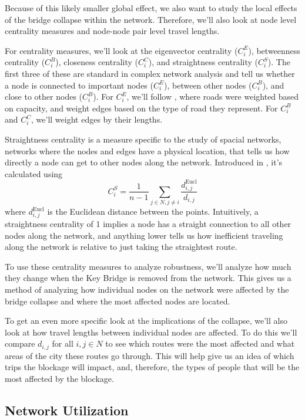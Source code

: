 \documentclass[11pt]{article}
\numberwithin{equation}{section} %
\numberwithin{figure}{section} %
\numberwithin{table}{section} %
\theoremstyle{definition}
\begin{document}
Because of this likely smaller global effect, we also want to study the local effects of the bridge collapse within the network. Therefore, we'll also look at node level centrality measures and node-node pair level travel lengths.

For centrality measures, we'll look at the eigenvector centrality ($C^E_i$), betweenness centrality ($C^B_i$), closeness centrality ($C^C_i$), and straightness centrality ($C^S_i$). The first three of these are standard in complex network analysis and tell us whether a node is connected to important nodes ($C^E_i$), between other nodes ($C^B_i$), and close to other nodes ($C^B_i$). For $C_i^E$, we'll follow \cite{Ando20}, where roads were weighted based on capacity, and weight edges based on the type of road they represent. For $C^B_i$ and $C^C_i$, we'll weight edges by their lengths.

Straightness centrality is a measure specific to the study of spacial networks, networks where the nodes and edges have a physical location, that tells us how directly a node can get to other nodes along the network. Introduced in \cite{Porta06}, it's calculated using 
\[
  C_i^S = \frac{1}{n-1} \sum_{j \in N, j \neq i} \frac{d_{i, j}^\text{Eucl}}{d_{i, j}}
\]
where $d_{i, j}^\text{Eucl}$ is the Euclidean distance between the points. Intuitively, a straightness centrality of 1 implies a node has a straight connection to all other nodes along the network, and anything lower tells us how inefficient traveling along the network is relative to just taking the straightest route.

To use these centrality measures to analyze robustness, we'll analyze how much they change when the Key Bridge is removed from the network. This gives us a method of analyzing how individual nodes on the network were affected by the bridge collapse and where the most affected nodes are located.

To get an even more specific look at the implications of the collapse, we'll also look at how travel lengths between individual nodes are affected. To do this we'll compare $d_{i, j}$ for all $i, j \in N$ to see which routes were the most affected and what areas of the city these routes go through. This will help give us an idea of which trips the blockage will impact, and, therefore, the types of people that will be the most affected by the blockage.


\subsection{Network Utilization}
\end{document}
